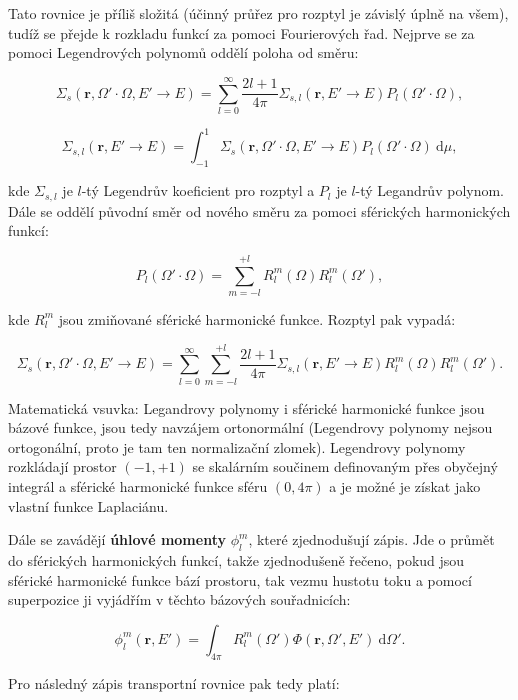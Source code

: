Tato rovnice je příliš složitá (účinný průřez pro rozptyl je závislý úplně na všem), tudíž se přejde k rozkladu funkcí za pomoci Fourierových řad. Nejprve se za pomoci Legendrových polynomů oddělí poloha od směru:

$$\Sigma_s(\textbf{r}, \Omega' \cdot \Omega, E' \rightarrow E) = \sum_{l=0}^{\infty} \dfrac{2l + 1}{4 \pi} \Sigma_{s,l}(\textbf{r}, E' \rightarrow E) P_l(\Omega' \cdot \Omega),$$

$$\Sigma_{s,l}(\textbf{r}, E' \rightarrow E) = \int_{-1}^1 \Sigma_s(\textbf{r}, \Omega' \cdot \Omega, E' \rightarrow E) P_l(\Omega' \cdot \Omega) \: \text{d}\mu,$$

\noindent kde $\Sigma_{s,l}$ je $l$-tý Legendrův koeficient pro rozptyl a $P_l$ je $l$-tý Legandrův polynom. Dále se oddělí původní směr od nového směru za pomoci sférických harmonických funkcí:

$$P_l(\Omega' \cdot \Omega) = \sum_{m=-l}^{+l} R_l^m(\Omega) R_l^m(\Omega'),$$

\noindent kde $R_l^m$ jsou zmiňované sférické harmonické funkce. Rozptyl pak vypadá:

$$\Sigma_s(\textbf{r}, \Omega' \cdot \Omega, E' \rightarrow E) = \sum_{l=0}^{\infty} \sum_{m=-l}^{+l} \dfrac{2l + 1}{4 \pi} \Sigma_{s,l}(\textbf{r}, E' \rightarrow E) R_l^m(\Omega) R_l^m(\Omega').$$

Matematická vsuvka: Legandrovy polynomy i sférické harmonické funkce jsou bázové funkce, jsou tedy navzájem ortonormální (Legendrovy polynomy nejsou ortogonální, proto je tam ten normalizační zlomek). Legendrovy polynomy rozkládají prostor $(-1, +1)$ se skalárním součinem definovaným přes obyčejný integrál a sférické harmonické funkce sféru $(0, 4 \pi)$ a je možné je získat jako vlastní funkce Laplaciánu.

Dále se zavádějí \textbf{úhlové momenty} $\phi_l^m$, které zjednodušují zápis. Jde o průmět do sférických harmonických funkcí, takže zjednodušeně řečeno, pokud jsou sférické harmonické funkce bází prostoru, tak vezmu hustotu toku a pomocí superpozice ji vyjádřím v těchto bázových souřadnicích:

$$\phi_l^m(\textbf{r}, E') = \int_{4 \pi} R_l^m (\Omega') \Phi(\textbf{r}, \Omega', E') \: \text{d}\Omega'.$$

Pro následný zápis transportní rovnice pak tedy platí:


